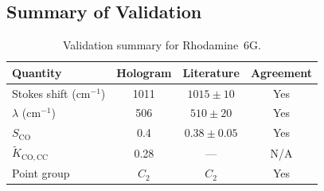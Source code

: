 \documentclass[11pt,twocolumn,a4paper]{article}
\theoremstyle{definition}
\theoremstyle{remark}
\begin{document}
\subsection{Summary of Validation}

\begin{table}[ht]
\centering
\caption{Validation summary for Rhodamine~6G.}
\label{tab:rhodamine_summary}
\begin{tabular}{lccc}
\toprule
Quantity & Hologram & Literature & Agreement \\
\midrule
Stokes shift (cm$^{-1}$)          & 1011  & $1015 \pm 10$    & Yes \\
$\lambda$ (cm$^{-1}$)             & 506   & $510 \pm 20$     & Yes \\
$S_{\mathrm{CO}}$                 & 0.4   & $0.38 \pm 0.05$  & Yes \\
$\tilde{K}_{\mathrm{CO,CC}}$      & 0.28  & ---              & N/A \\
Point group                        & $C_2$ & $C_2$            & Yes \\
\bottomrule
\end{tabular}
\end{table}
\end{document}
